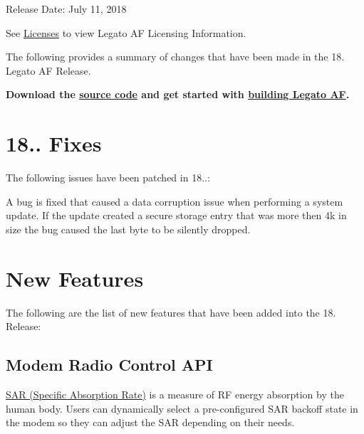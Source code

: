 Release Date\+: July 11, 2018

See \hyperlink{aboutLicenses}{Licenses} to view Legato AF Licensing Information.

The following provides a summary of changes that have been made in the 18. Legato AF Release.

{\bfseries  Download the \hyperlink{aboutReleaseInfo}{source code} and get started with \hyperlink{basicBuild}{building Legato AF}. }\hypertarget{releaseNotes18060_rn1806_Patches}{}\section{18.. Fixes}\label{releaseNotes18060_rn1806_Patches}
The following issues have been patched in 18..\+:


\begin{DoxyItemize}
\item A bug is fixed that caused a data corruption issue when performing a system update. If the update created a secure storage entry that was more then 4k in size the bug caused the last byte to be silently dropped.
\end{DoxyItemize}\hypertarget{releaseNotes18060_rn1806_Features}{}\section{New Features}\label{releaseNotes18060_rn1806_Features}
The following are the list of new features that have been added into the 18. Release\+:\hypertarget{releaseNotes18060_rn1806_Features_SAR}{}\subsection{Modem Radio Control A\+PI}\label{releaseNotes18060_rn1806_Features_SAR}
\hyperlink{c_mrc_le_mrc_sar}{S\+AR (Specific Absorption Rate)} is a measure of RF energy absorption by the human body. Users can dynamically select a pre-\/configured S\+AR backoff state in the modem so they can adjust the S\+AR depending on their needs.

